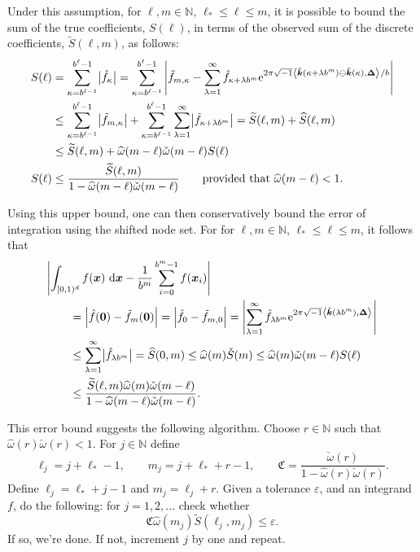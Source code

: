 \documentclass[graybox,footinfo]{svmult}
\newcommand{\naturals}{\mathbb{N}} %
\newcommand{\dif}{\,\mathrm{d}} %
\newcommand{\vzero}{\boldsymbol{0}} %
\newcommand{\vx}{\boldsymbol{x}}    %
\newcommand{\vDelta}{\boldsymbol{\Delta}}    %
\newcommand{\cube}{[0,1)^d}
\newcommand{\ip}[3][{}]{\ensuremath{\left \langle #2, #3 \right \rangle_{#1}}}
\newcommand{\vk}{\boldsymbol{k}}    %
\newcommand{\tvk}{\tilde{\vk}}
\newcommand{\hf}{\hat{f}}
\newcommand{\tf}{\tilde{f}}
\newcommand{\bigabs}[1]{\ensuremath{\bigl \lvert #1 \bigr \rvert}}
\newcommand{\hS}{\widehat{S}}
\newcommand{\wcS}{\check{S}}
\newcommand{\tS}{\widetilde{S}}
\newcommand{\homega}{\widehat{\omega}}
\newcommand{\wcomega}{\check{\omega}}
\newcommand{\abs}[1]{\ensuremath{\left \lvert #1 \right \rvert}}
\newcommand{\fudge}{\mathfrak{C}}
\begin{document}
Under this assumption, for $\ell, m \in \naturals$, $\ell_* \le \ell \le m$, it is possible to bound the sum of the true coefficients, $S(\ell)$, in terms of the observed sum of the discrete coefficients, $\tS(\ell,m)$, as follows:
\begin{align*}
S(\ell) &= \sum_{\kappa=b^{\ell-1}}^{b^{\ell}-1} \bigl \lvert \hf_{\kappa}\bigr\rvert= \sum_{\kappa=b^{\ell-1}}^{b^{\ell}-1} \abs{\tf_{m,\kappa} - \sum_{\lambda=1}^{\infty} \hf_{\kappa+\lambda b^{m}} \E^{2 \pi \sqrt{-1} \ip{\tvk(\kappa+\lambda b^{m}) \ominus \tvk(\kappa)}{\vDelta}/b}}\\
&\le \sum_{\kappa=b^{\ell-1}}^{b^{\ell}-1} \bigl \lvert \tf_{m,\kappa} \bigr\rvert + \sum_{\kappa=b^{\ell-1}}^{b^{\ell}-1} \sum_{\lambda=1}^{\infty} \bigl \lvert \hf_{\kappa+\lambda b^{m}}\bigr\rvert = \tS(\ell,m) + \hS(\ell,m) \\
&\le \tS(\ell,m) + \homega(m-\ell) \wcomega(m-\ell) S(\ell) \\
S(\ell) & \le \frac{\tS(\ell,m)}{1 - \homega(m-\ell) \wcomega(m-\ell)} \qquad \text{provided that } \homega(m-\ell) < 1.
\end{align*}

Using this upper bound, one can then conservatively bound the error of integration using the shifted node set.  For for $\ell, m \in \naturals$, $\ell_* \le \ell \le m$, it follows that
\begin{align*}
\MoveEqLeft{\abs{\int_{\cube} f(\vx) \, \dif \vx - \frac{1}{b^m} \sum_{i=0}^{b^m-1} f(\vx_i) }}\\
&= \abs{\hf(\vzero) - \tf_m(\vzero)} = \abs{\hf_0 - \tf_{m,0}} = \abs{\sum_{\lambda=1}^{\infty} \hf_{\lambda b^{m}} \E^{2 \pi \sqrt{-1}\ip{\tvk(\lambda b^{m})}{\vDelta}}}\\
&\le \sum_{\lambda=1}^{\infty} \bigabs{\hf_{\lambda b^{m}}}
= \hS(0,m) \le \homega(m) \wcS(m) \le \homega(m) \wcomega(m-\ell) S(\ell) \\
& \le \frac{\tS(\ell,m)\homega(m) \wcomega(m-\ell)}{1 - \homega(m-\ell) \wcomega(m-\ell)}.
\end{align*}

This error bound suggests the following algorithm.  Choose $r \in \naturals$ such that $\homega(r)\wcomega(r)<1$.  For $j \in \naturals$ define
\[
\ell_j=j+\ell_*-1, \qquad  m_j=j+\ell_*+r-1, \qquad  \fudge = \frac{\wcomega(r)}{1 - \homega(r)\wcomega(r)}.
\]
Define $\ell_j=\ell_*+j-1$ and $m_j=\ell_j+r$.  Given a tolerance $\varepsilon$, and an integrand $f$, do the following:  for $j=1, 2, \ldots$ check whether
\[
\fudge \homega(m_j)  \tS(\ell_j,m_j) \le \varepsilon.
\]
If so, we're done.  If not, increment $j$ by one and repeat.
\end{document}
